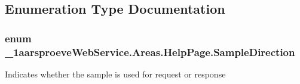 \subsection{Enumeration Type Documentation}
\hypertarget{namespace__1aarsproeve_web_service_1_1_areas_1_1_help_page_a3b5e2312590d86c11aab0e939d9e102b}{}
\subsubsection[{Sample\+Direction}]{\setlength{\rightskip}{0pt plus 5cm}enum {\bf \+\_\+1aarsproeve\+Web\+Service.\+Areas.\+Help\+Page.\+Sample\+Direction}}\label{namespace__1aarsproeve_web_service_1_1_areas_1_1_help_page_a3b5e2312590d86c11aab0e939d9e102b}


Indicates whether the sample is used for request or response 

